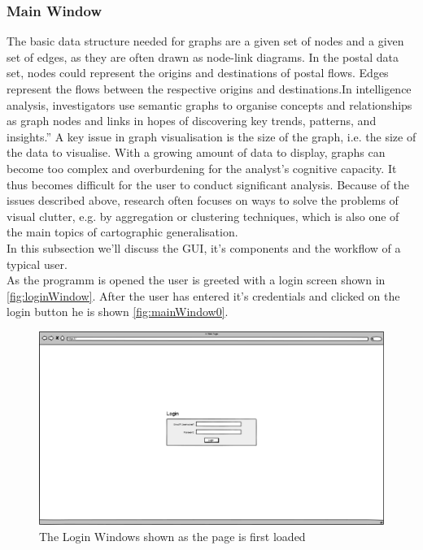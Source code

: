 \documentclass[twoside, english, draft]{Pflichtenheft}
\begin{document}
\subsubsection{Main Window}
The basic data structure needed for graphs are a given set of nodes and a given set of edges, as they are often drawn
as node-link diagrams. In the postal data set, nodes could represent the origins and destinations of postal flows. Edges represent the flows between the respective origins and destinations.In intelligence analysis, investigators use semantic graphs to organise concepts and relationships as graph nodes and links in hopes of discovering key trends, patterns, and insights.” A key issue in graph visualisation is the size of the graph, i.e. the size of the data to visualise. With a growing amount of data to display, graphs can become too complex and overburdening for the analyst’s cognitive capacity. It thus becomes difficult for the user to conduct significant analysis. Because of the issues described above, research often focuses on ways to solve the problems of visual clutter, e.g. by aggregation or clustering techniques, which is also one of the main topics of cartographic generalisation.
\\
In this subsection we'll discuss the GUI, it's components and the workflow of a typical user.
\\
As the programm is opened the user is greeted with a login screen shown in \autoref{fig:loginWindow}. After the user has entered it's credentials and clicked on the login button he is shown \autoref{fig:mainWindow0}.
\\
\vfill

\begin{figure}[h]
	\centering
	\includegraphics[width=\textwidth]{Images/01MWL.png}
	\caption{The Login Windows shown as the page is first loaded}
	\label{fig:loginWindow}
\end{figure}
\end{document}
